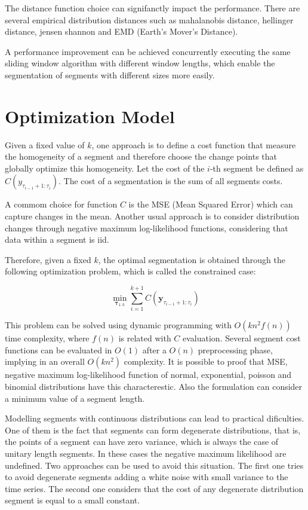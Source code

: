 The distance function choice can signifanctly impact the performance. There are several empirical distribution distances such as mahalanobis distance, hellinger distance, jensen shannon and EMD (Earth's Mover's Distance).  

A performance improvement can be achieved concurrently executing the same sliding window algorithm with different window lengths, which enable the segmentation of segments with different sizes more easily.

\section{Optimization Model}  

Given a fixed value of $k$, one approach is to define a cost function that measure the homogeneity of a segment and therefore choose the change points that globally optimize this homogeneity. Let the cost of the $i$-th segment be defined as $C(y_{\tau_{i - 1} + 1 : \tau_{i}})$. The cost of a segmentation is the sum of all segments costs.

A commom choice for function $C$ is the MSE (Mean Squared Error) which can capture changes in the mean. Another usual approach is to consider distribution changes through negative maximum log-likelihood functions, considering that data within a segment is iid. 

Therefore, given a fixed $k$, the optimal segmentation is obtained through the following optimization problem, which is called the constrained case: 

\begin{equation}
    \min_{\boldsymbol \tau_{1 : k}} \sum \limits_{i = 1}^{k + 1} C(\mathbf{y}_{\tau_{i - 1} + 1 : \tau_{i}})
\end{equation}

This problem can be solved using dynamic programming with $O(k n^2 f(n))$ time complexity, where $f(n)$ is related with $C$ evaluation. Several segment cost functions can be evaluated in $O(1)$ after a $O(n)$ preprocessing phase, implying in an overall $O(k n^2)$ complexity. It is possible to proof that MSE, negative maximum log-likelihood function of normal, exponential, poisson and binomial distributions have this characterestic. Also the formulation can consider a minimum value of a segment length.

Modelling segments with continuous distributions can lead to practical dificulties. One of them is the fact that segments can form degenerate distributions, that is, the points of a segment can have zero variance, which is always the case of unitary length segments. In these cases the negative maximum likelihood are undefined. Two approaches can be used to avoid this situation. The first one tries to avoid degenerate segments adding a white noise with small variance to the time series. The second one considers that the cost of any degenerate distribution segment is equal to a small constant.

